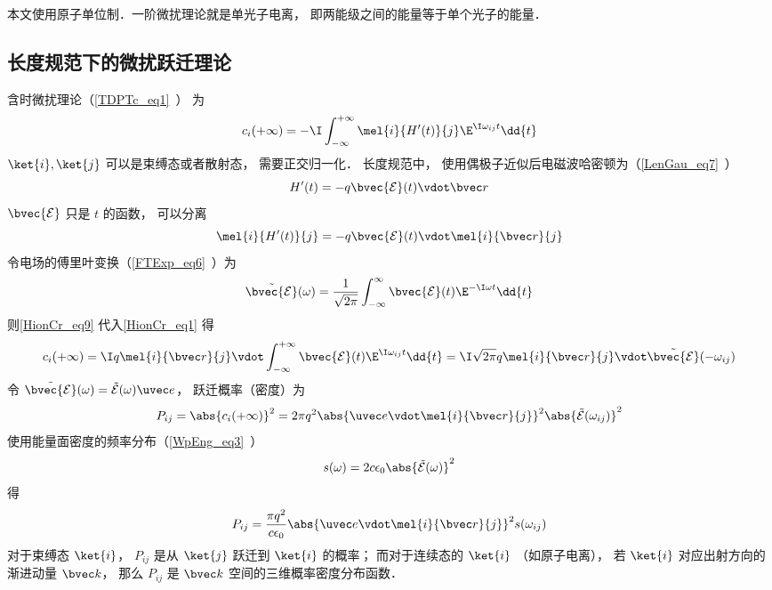 

本文使用原子单位制．一阶微扰理论就是单光子电离， 即两能级之间的能量等于单个光子的能量．

\subsection{长度规范下的微扰跃迁理论}
含时微扰理论（\autoref{TDPTc_eq1}~） 为
\begin{equation}\label{HionCr_eq1}
c_i(+\infty) = -\I \int_{-\infty}^{+\infty} \mel{i}{H'(t)}{j} \E^{\I\omega_{ij} t} \dd{t}
\end{equation}
$\ket{i},\ket{j}$ 可以是束缚态或者散射态， 需要正交归一化． 长度规范中， 使用偶极子近似后电磁波哈密顿为（\autoref{LenGau_eq7}~）
\begin{equation}
H'(t) = -q\bvec {\mathcal E}(t) \vdot \bvec r
\end{equation}
$\bvec {\mathcal E}$ 只是 $t$ 的函数， 可以分离
\begin{equation}\label{HionCr_eq9}
\mel{i}{H'(t)}{j} = -q\bvec {\mathcal E}(t) \vdot \mel{i}{\bvec r}{j}
\end{equation}
令电场的傅里叶变换（\autoref{FTExp_eq6}~）为
\begin{equation}
\tilde {\bvec {\mathcal E}}(\omega) = \frac{1}{\sqrt{2\pi}} \int_{-\infty}^{\infty} \bvec {\mathcal E}(t) \E^{-\I\omega t} \dd{t}
\end{equation}
则\autoref{HionCr_eq9} 代入\autoref{HionCr_eq1} 得
\begin{equation}\label{HionCr_eq7}
c_i(+\infty) = \I q \mel{i}{\bvec r}{j} \vdot \int_{-\infty}^{+\infty} \bvec {\mathcal E}(t) \E^{\I\omega_{ij} t} \dd{t} = \I \sqrt{2\pi} q \mel{i}{\bvec r}{j} \vdot \tilde {\bvec {\mathcal E}}(-\omega_{ij})
\end{equation}
令 $\tilde {\bvec {\mathcal E}}(\omega) = \tilde {{\mathcal E}}(\omega)\uvec e$， 跃迁概率（密度）为
\begin{equation}\label{HionCr_eq2}
P_{ij} = \abs{c_i(+\infty)}^2 = 2\pi q^2 \abs{\uvec e \vdot \mel{i}{\bvec r}{j}}^2 \abs{\tilde {{\mathcal E}}(\omega_{ij})}^2
\end{equation}
使用能量面密度的频率分布（\autoref{WpEng_eq3}~）
\begin{equation}\label{HionCr_eq8}
s(\omega) = 2c\epsilon_0 \abs{\tilde {{\mathcal E}}(\omega)}^2
\end{equation}
得
\begin{equation}\label{HionCr_eq6}
P_{ij} = \frac{\pi q^2}{c\epsilon_0} \abs{\uvec e \vdot\mel{i}{\bvec r}{j}}^2 s(\omega_{ij})
\end{equation}
对于束缚态 $\ket{i}$， $P_{ij}$ 是从 $\ket{j}$ 跃迁到 $\ket{i}$ 的概率； 而对于连续态的 $\ket{i}$ （如原子电离）， 若 $\ket{i}$ 对应出射方向的渐进动量 $\bvec k$， 那么 $P_{ij}$ 是 $\bvec k$ 空间的三维概率密度分布函数．

